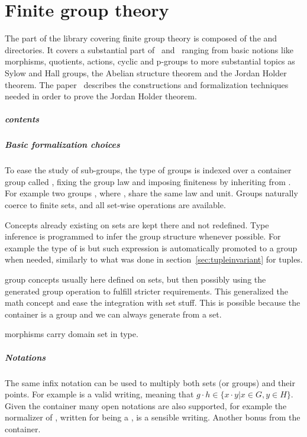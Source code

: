\chapter{Finite group theory}

The part of the library covering finite group theory is composed of
the  and  directories.  It covers a substantial
part of~\cite{gorenstein2007finite} and~\cite{9781139175319} ranging from
basic notions like morphisms, quotients, actions, cyclic and p-groups to more
substantial topics as Sylow and Hall groups, the Abelian
structure theorem and the Jordan Holder theorem.
The paper~\cite{DBLP:conf/mkm/Mahboubi13}
describes the constructions and formalization techniques
needed in order to prove the Jordan Holder theorem.

\paragraph{contents}


\paragraph{Basic formalization choices} To ease the study of sub-groups,
the type of groups is indexed over a container group called
, fixing the group law and imposing finiteness by
inheriting from .
For example two groups ,
where , share the same law and unit.  Groups
naturally coerce to finite sets, and all set-wise operations are available.

Concepts already existing on sets are kept there and not redefined.
Type inference is programmed to infer the group structure whenever possible.
For example the type of  is  but such expression
is automatically promoted to a group when needed, similarly to what 
was done in section~\ref{sec:tupleinvariant} for tuples.

group concepts usually here defined on sets, but then
possibly using the generated group operation to fulfill
stricter requirements.  This generalized the math concept and
ease the integration with set stuff.  This is possible because
the container is a group and we can always generate from a set.

morphisms carry domain set in type.

\paragraph{Notations} The same infix \C{*} notation can be used to
multiply both sets (or groups) and their points.  For example
 is a valid writing, meaning that
$g\cdot h \in \{ x\cdot y | x \in G, y \in H\}$.  Given the 
container many open notations are also supported, for example the normalizer
of , written  for  being a , is a sensible
writing. Another bonus from the container.

